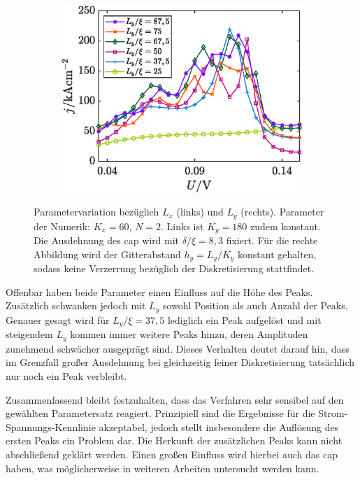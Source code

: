 \begin{figure}
\begin{subfigure}[b]{0.48\textwidth}
        \includegraphics[width=\textwidth]{plots/IV/IV_Ly_variation.eps}
        \label{fig:iv3_2}
    \end{subfigure}
    \caption[]
    {Parametervariation bezüglich $L_x$ (links) und $L_y$ (rechts). Parameter der Numerik: $K_x=60$, $N=2$. Links ist  $K_y=180$ zudem konstant. Die Ausdehnung des \ac{cap} wird mit $\delta/\xi=8,3$ fixiert. Für die rechte Abbildung wird der Gitterabstand $h_y=L_y/K_y$ konstant gehalten, sodass keine Verzerrung bezüglich der Diskretisierung stattfindet.}
    \label{fig:iv3}
\end{figure}
Offenbar haben beide Parameter einen Einfluss auf die Höhe des Peaks. Zusätzlich schwanken jedoch mit $L_y$ sowohl Position als auch Anzahl der Peaks. Genauer gesagt wird für $L_y/\xi=37,5$ lediglich ein Peak aufgelöst und mit steigendem $L_y$ kommen immer weitere Peaks hinzu, deren Amplituden zunehmend schwächer ausgeprägt sind. Dieses Verhalten deutet darauf hin, dass im Grenzfall großer Ausdehnung bei gleichzeitig feiner Diskretisierung tatsächlich nur noch ein Peak verbleibt.

Zusammenfassend bleibt festzuhalten, dass das Verfahren sehr sensibel auf den gewählten Parametersatz reagiert. Prinzipiell sind die Ergebnisse für die Strom-Spannungs-Kennlinie akzeptabel, jedoch stellt insbesondere die Auflösung des ersten Peaks ein  Problem dar. Die Herkunft der zusätzlichen Peaks kann nicht abschließend geklärt werden. Einen großen Einfluss wird hierbei auch das \ac{cap} haben, was möglicherweise in weiteren Arbeiten untersucht werden kann.



